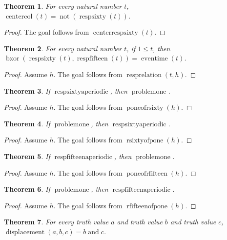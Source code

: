 \documentclass[11pt]{article}
\newtheorem{theorem}{Theorem}[section]
\theoremstyle{definition}
\begin{document}
\begin{theorem}
\label{ll:paper:center-response}
For every natural number \(t\), \(\operatorname{centercol}(t) = \operatorname{not}(\operatorname{respsixty}(t))\).
\end{theorem}
\begin{proof}
The goal follows from \(\operatorname{centerrespsixty}(t)\).
\end{proof}
\begin{theorem}
\label{ll:paper:orthogonal-responses}
For every natural number \(t\), if \(1 \le t\), then \(\operatorname{bxor}(\operatorname{respsixty}(t), \operatorname{respfifteen}(t)) = \operatorname{eventime}(t)\).
\end{theorem}
\begin{proof}
Assume \(h\).
The goal follows from \(\operatorname{resprelation}(t, h)\).
\end{proof}
\begin{theorem}
\label{ll:paper:projection-sixty-sufficient}
If \(\operatorname{respsixtyaperiodic}\), then \(\operatorname{problemone}\).
\end{theorem}
\begin{proof}
Assume \(h\).
The goal follows from \(\operatorname{poneofrsixty}(h)\).
\end{proof}
\begin{theorem}
\label{ll:paper:projection-sixty-necessary}
If \(\operatorname{problemone}\), then \(\operatorname{respsixtyaperiodic}\).
\end{theorem}
\begin{proof}
Assume \(h\).
The goal follows from \(\operatorname{rsixtyofpone}(h)\).
\end{proof}
\begin{theorem}
\label{ll:paper:projection-fifteen-sufficient}
If \(\operatorname{respfifteenaperiodic}\), then \(\operatorname{problemone}\).
\end{theorem}
\begin{proof}
Assume \(h\).
The goal follows from \(\operatorname{poneofrfifteen}(h)\).
\end{proof}
\begin{theorem}
\label{ll:paper:projection-fifteen-necessary}
If \(\operatorname{problemone}\), then \(\operatorname{respfifteenaperiodic}\).
\end{theorem}
\begin{proof}
Assume \(h\).
The goal follows from \(\operatorname{rfifteenofpone}(h)\).
\end{proof}
\begin{theorem}
\label{ll:paper:displacement-carry}
For every truth value \(a\) and truth value \(b\) and truth value \(c\), \(\operatorname{displacement}(a, b, c) = b \operatorname{and} c\).
\end{theorem}
\end{document}

